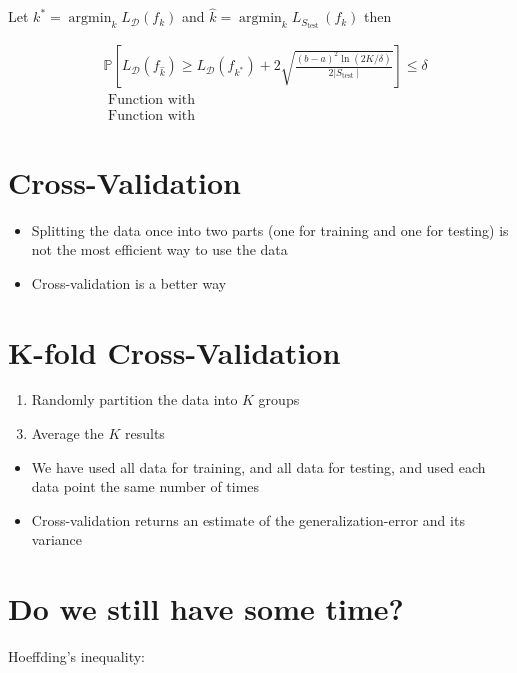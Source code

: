 Let $k^{*}=\operatorname{argmin}_{k} L_{\mathscr{D}}\left(f_{k}\right)$ and $\hat{k}=\operatorname{argmin}_{k} L_{S_{\text {test }}}\left(f_{k}\right)$ then

$$
\begin{aligned}
& \mathbb{P}\left[L_{\mathscr{D}}\left(f_{\hat{k}}\right) \geq L_{\mathscr{D}}\left(f_{k^{*}}\right)+2 \sqrt{\frac{(b-a)^{2} \ln (2 K / \delta)}{2\left|S_{\text {test }}\right|}}\right] \leq \delta \\
& \text { Function with } \\
& \text { Function with }
\end{aligned}
$$

\section*{Cross-Validation}

\begin{itemize}
  \item Splitting the data once into two parts (one for training and one for testing) is not the most efficient way to use the data
  \item Cross-validation is a better way
\end{itemize}

\section*{K-fold Cross-Validation}
\begin{enumerate}
  \item Randomly partition the data into $K$ groups
\end{enumerate}



\begin{enumerate}
  \setcounter{enumi}{2}
  \item Average the $K$ results
\end{enumerate}

\begin{itemize}
  \item We have used all data for training, and all data for testing, and used each data point the same number of times
  \item Cross-validation returns an estimate of the generalization-error and its variance
\end{itemize}

\section*{Do we still have some time?}
Hoeffding's inequality:

